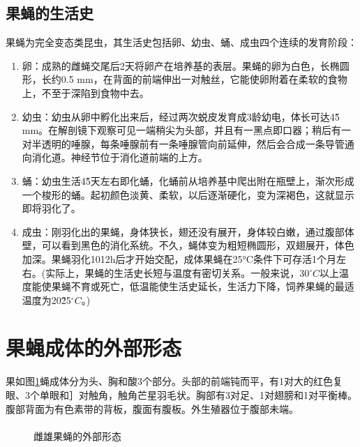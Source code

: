 \documentclass[AutoFakeBold]{LZUThesis}
\newcommand{\upcite}[1]{\textsuperscript{\textsuperscript{\cite{#1}}}}
\begin{document}
\subsection{果蝇的生活史}
果蝇为完全变态类昆虫，其生活史包括卵、幼虫、蛹、成虫四个连续的发育阶段：
\begin{enumerate}
    \item 卵：成熟的雌蝇交尾后2天将卵产在培养基的表层。果蝇的卵为白色，长椭圆形，长约0.5 mm，在背面的前端伸出一对触丝，它能使卵附着在柔软的食物上，不至于深陷到食物中去。
    \item 幼虫：幼虫从卵中孵化出来后，经过两次蜕皮发育成3龄幼电，体长可达4\~5 mm。在解剖镜下观察可见一端稍尖为头部，并且有一黑点即口器；稍后有一对半透明的唾腺，每条唾腺前有一条唾腺管向前延伸，然后会合成一条导管通向消化道。神经节位于消化道前端的上方。
    \item 蛹：幼虫生活4\~5天左右即化蛹，化蛹前从培养基中爬出附在瓶壁上，渐次形成一个梭形的蛹。起初颜色淡黄、柔软，以后逐渐硬化，变为深褐色，这就显示即将羽化了。
    \item 成虫：刚羽化出的果蝇，身体狭长，翅还没有展开，身体较白嫩，通过腹部体壁，可以看到黑色的消化系统。不久，蝇体变为粗短椭圆形，双翅展开，体色加深。果蝇羽化10\～12h后才开始交配，成体果蝇在25°C条件下可存活1个月左右。(实际上，果蝇的生活史长短与温度有密切关系。一般来说，30$^{\circ}C$以上温度能使果蝇不育或死亡，低温能使生活史延长，生活力下降，饲养果蝇的最适温度为20\~25$^{\circ}C$。)
\end{enumerate}
\section{果蝇成体的外部形态}
果如图\ref{fig:fruitfly}蝇成体分为头、胸和酸3个部分。头部的前端钝而平，有1对大的红色复眼、3个单眼和］对触角，触角芒星羽毛状。胸部有3对足、1对翅膀和1对平衡棒。腹部背面为有色素带的背板，腹面有腹板。外生殖器位于腹部未端。
\begin{figure}[htbp]
    \centering
    \hfill
    \caption{雌雄果蝇的外部形态\upcite{niu2018}}
    \label{fig:fruitfly}
\end{figure}
\end{document}
